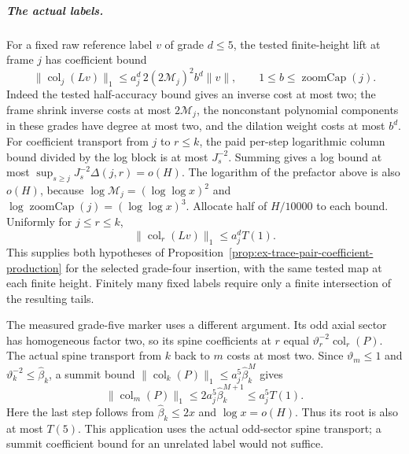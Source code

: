 \subparagraph{The actual labels.}
For a fixed raw reference label $v$ of grade $d\le5$, the tested
finite-height lift at frame $j$ has coefficient bound
\[
 \|\operatorname{col}_j(Lv)\|_1
 \le a_j^d\,2(2\mathcal M_j)^2 b^d\|v\|,
 \qquad1\le b\le\operatorname{zoomCap}(j).
\]
Indeed the tested half-accuracy bound gives an inverse cost at most two;
the frame shrink inverse costs at most $2\mathcal M_j$, the
nonconstant polynomial components in these grades have degree at most
two, and the dilation weight costs at most $b^d$.
For coefficient transport from $j$ to $r\le k$, the paid per-step
logarithmic column bound divided by the log block is at most $J_s^{-2}$.
Summing gives a log bound at most
$\sup_{s\ge j}J_s^{-2}\Delta(j,r)=o(H)$.
The logarithm of the prefactor above is also $o(H)$, because
$\log\mathcal M_j=(\log\log x)^2$ and
$\log\operatorname{zoomCap}(j)=(\log\log x)^3$.
Allocate half of $H/10000$ to each bound. Uniformly for $j\le r\le k$,
\[
 \|\operatorname{col}_r(Lv)\|_1\le a_j^dT(1).
\]
This supplies both hypotheses of
Proposition~\ref{prop:ex-trace-pair-coefficient-production} for the
selected grade-four insertion, with the same tested map at each
finite height. Finitely many fixed labels require only a finite
intersection of the resulting tails.

The measured grade-five marker uses a different argument. Its odd
axial sector has homogeneous factor two, so its spine coefficients at
$r$ equal $\vartheta_r^{-2}\operatorname{col}_r(P)$.
The actual spine transport from $k$ back to $m$ costs at most two.
Since $\vartheta_m\le1$ and
$\vartheta_k^{-2}\le\widehat\beta_k$, a summit bound
$\|\operatorname{col}_k(P)\|_1\le a_j^5\widehat\beta_k^M$
gives
\[
 \|\operatorname{col}_m(P)\|_1
 \le2a_j^5\widehat\beta_k^{M+1}\le a_j^5T(1).
\]
Here the last step follows from $\widehat\beta_k\le2x$ and
$\log x=o(H)$. Thus its root is also at most $T(5)$.
This application uses the actual odd-sector spine transport; a summit
coefficient bound for an unrelated label would not suffice.


